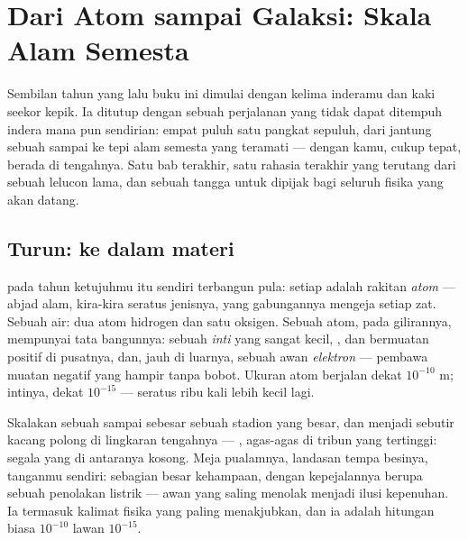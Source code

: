 \chapter{Dari Atom sampai Galaksi: Skala Alam Semesta}\label{ch:g9:atoms-to-galaxies}

Sembilan tahun yang lalu buku ini dimulai dengan kelima inderamu dan
kaki seekor kepik. Ia ditutup dengan sebuah perjalanan yang tidak dapat
ditempuh indera mana pun sendirian: empat puluh satu pangkat sepuluh,
dari jantung sebuah  sampai ke tepi alam semesta yang teramati ---
dengan kamu, cukup tepat, berada di tengahnya. Satu bab terakhir, satu
rahasia terakhir yang terutang dari sebuah lelucon lama, dan sebuah
tangga untuk dipijak bagi seluruh fisika yang akan datang.

\section{Turun: ke dalam materi}

\begin{definition}[Atom]\label{def:g9:atoms-to-galaxies:atom}
 pada tahun ketujuhmu itu sendiri terbangun pula: setiap 
adalah rakitan \emph{atom} --- abjad alam, kira-kira
seratus jenisnya, yang gabungannya mengeja setiap zat. Sebuah 
air: dua atom hidrogen dan satu oksigen. Sebuah atom, pada gilirannya,
mempunyai tata bangunnya: sebuah \emph{inti} yang sangat
kecil, , dan bermuatan positif di pusatnya, dan, jauh di luarnya,
sebuah awan \emph{elektron} --- pembawa muatan negatif
yang hampir tanpa bobot. Ukuran atom berjalan dekat $10^{-10}$
\unit{m}; intinya, dekat $10^{-15}$ --- seratus ribu kali lebih kecil
lagi.
\end{definition}

\begin{proposition}\label{prop:g9:atoms-to-galaxies:empty}
Skalakan sebuah  sampai sebesar sebuah stadion yang besar, dan
 menjadi sebutir kacang polong di lingkaran tengahnya ---
, agas-agas di tribun yang tertinggi: segala yang di
antaranya kosong. Meja pualamnya, landasan tempa besinya, tanganmu
sendiri: sebagian besar kehampaan, dengan kepejalannya berupa sebuah
penolakan listrik --- awan   yang saling menolak menjadi
ilusi kepenuhan. Ia termasuk kalimat fisika yang paling menakjubkan,
dan ia adalah hitungan biasa $10^{-10}$ lawan $10^{-15}$.
\end{proposition}

